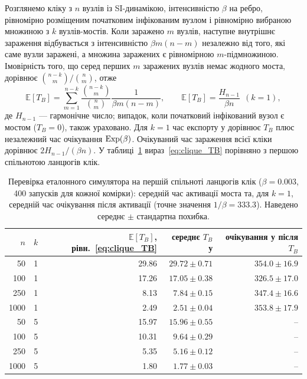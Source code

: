 Розглянемо кліку з $n$ вузлів із SI-динамікою, інтенсивністю $\beta$ на ребро, рівномірно розміщеним початковим інфікованим вузлом і рівномірно вибраною множиною з $k$ вузлів-мостів. Коли заражено $m$ вузлів, наступне внутрішнє зараження відбувається з інтенсивністю $\beta m(n-m)$ незалежно від того, які саме вузли заражені, а множина заражених є рівномірною $m$-підмножиною. Імовірність того, що серед перших $m$ заражених вузлів немає жодного моста, дорівнює $\binom{n-k}{m}/\binom{n}{m}$, отже
\begin{equation}
\label{eq:clique_TB}
\mathbb{E}[T_B]=\sum_{m=1}^{n-k}\frac{\binom{n-k}{m}}{\binom{n}{m}}\frac{1}{\beta m(n-m)},
\qquad
\mathbb{E}[T_B]=\frac{H_{n-1}}{\beta n}\ \ (k=1),
\end{equation}
де $H_{n-1}$ --- гармонічне число; випадок, коли початковий інфікований вузол є мостом ($T_B=0$), також ураховано. Для $k=1$ час експорту у \Full{} дорівнює $T_B$ плюс незалежний час очікування $\mathrm{Exp}(\beta)$. Очікуваний час зараження всієї кліки дорівнює $2H_{n-1}/(\beta n)$. У таблиці~\ref{tab:verification} вираз~\eqref{eq:clique_TB} порівняно з першою спільнотою ланцюгів клік.

\begin{table}[tbp]
\centering
\caption{Перевірка еталонного симулятора на першій спільноті ланцюгів клік ($\beta=0.003$, 400 запусків для кожної комірки): середній час активації моста та, для $k=1$, середній час очікування після активації (точне значення $1/\beta=333.3$). Наведено середнє $\pm$ стандартна похибка.}
\label{tab:verification}
\small
\begin{tabular}{rrrrr}
\toprule
$n$ & $k$ & $\mathbb{E}[T_B]$, рівн.~\eqref{eq:clique_TB} & середнє $T_B$ у \Full{} & очікування у \Full{} після $T_B$\\
\midrule
50 & 1 & 29.86 & $29.72\pm0.71$ & $354.0\pm16.9$\\
100 & 1 & 17.26 & $17.05\pm0.38$ & $326.5\pm17.0$\\
250 & 1 & 8.13 & $7.84\pm0.15$ & $347.4\pm16.6$\\
1000 & 1 & 2.49 & $2.51\pm0.04$ & $353.8\pm17.9$\\
50 & 5 & 15.97 & $15.96\pm0.55$ & --\\
100 & 5 & 10.31 & $9.64\pm0.29$ & --\\
250 & 5 & 5.35 & $5.16\pm0.12$ & --\\
1000 & 5 & 1.80 & $1.77\pm0.03$ & --\\
\bottomrule
\end{tabular}
\end{table}

